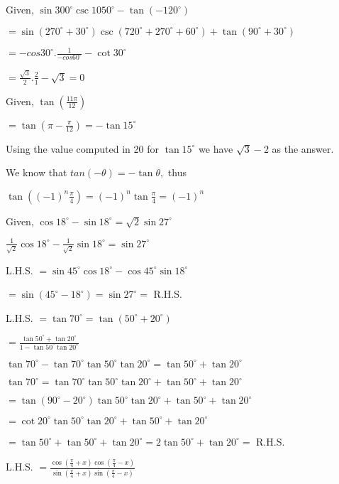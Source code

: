 \item Given, $\sin 300^\circ \csc 1050^\circ - \tan(-120^\circ)$

  $= \sin (270^\circ + 30^\circ)\csc(720^\circ + 270^\circ + 60^\circ) + \tan(90^\circ + 30^\circ)$

  $= -cos 30^\circ. \frac{1}{-cos 60^\circ} - \cot 30^\circ$

  $= \frac{\sqrt{3}}{2}.\frac{2}{1} - \sqrt{3} = 0$

\item Given, $\tan\left(\frac{11\pi}{12}\right)$

  $= \tan\left(\pi - \frac{\pi}{12}\right) = -\tan15^\circ$

  Using the value computed in 20 for $\tan15^\circ$ we have $\sqrt{3} - 2$ as the answer.

\item We know that $tan(-\theta) = -\tan\theta,$ thus

  $\tan \left((-1)^n\frac{\pi}{4}\right) = (-1)^n\tan\frac{\pi}{4} = (-1)^n$

\item Given, $\cos 18^\circ - \sin 18^\circ = \sqrt{2}\sin 27^\circ$

  $\frac{1}{\sqrt{2}}\cos 18^\circ - \frac{1}{\sqrt{2}}\sin18^\circ = \sin 27^\circ$

  L.H.S. $= \sin45^\circ\cos18^\circ - \cos45^\circ\sin18^\circ$

  $= \sin(45^\circ - 18^\circ) = \sin 27^\circ =$ R.H.S.

\item L.H.S. $=\tan 70^\circ = \tan(50^\circ + 20^\circ)$

  $= \frac{\tan 50^\circ + \tan 20^\circ}{1 - \tan50^\circ\tan20^\circ}$

  $\tan70^\circ - \tan70^\circ\tan50^\circ\tan20^\circ = \tan 50^\circ + \tan 20^\circ$

  $\tan70^\circ = \tan70^\circ\tan50^\circ\tan20^\circ + \tan 50^\circ + \tan 20^\circ$

  $= \tan(90^\circ - 20^\circ)\tan50^\circ\tan20^\circ + \tan 50^\circ + \tan 20^\circ$

  $= \cot20^\circ\tan50^\circ\tan20^\circ + \tan 50^\circ + \tan 20^\circ$

  $= \tan 50^\circ + \tan 50^\circ + \tan 20^\circ = 2\tan50^\circ + \tan20^\circ =$ R.H.S.

\item L.H.S. $= \frac{\cos\left(\frac{\pi}{4} + x\right)\cos\left(\frac{\pi}{4} - x\right)}{\sin\left(\frac{\pi}{4} +
  x\right)\sin\left(\frac{\pi}{4} - x\right)}$

